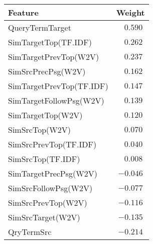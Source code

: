 \begin{tabular}{@{}lc@{}}
\toprule
Feature & Weight \\
\midrule
QueryTermTarget & $\;\:\:0.590$ \\ 
SimTargetTop(TF.IDF) & $\;\:\:0.262$ \\ 
SimTargetPrevTop(W2V) & $\;\:\:0.237$ \\
SimSrcPrecPsg(W2V) & $\;\:\:0.162$ \\ SimTargetPrevTop(TF.IDF) & $\;\:\:0.147$ \\ 
SimTargetFollowPsg(W2V) & $\;\:\:0.139$ \\ 
SimTargetTop(W2V) & $\;\:\:0.120$ \\ 
SimSrcTop(W2V) & $\;\:\:0.070$ \\ 
SimSrcPrevTop(TF.IDF) & $\;\:\:0.040$ \\ 
SimSrcTop(TF.IDF) & $\;\:\:0.008$ \\ 
SimTargetPrecPsg(W2V) & $-0.046$ \\ 
SimSrcFollowPsg(W2V) & $-0.077$ \\ 
SimSrcPrevTop(W2V) & $-0.116$ \\ 
SimSrcTarget(W2V) & $-0.135$ \\ 
QryTermSrc & $-0.214$ \\ 
\bottomrule
\end{tabular}
